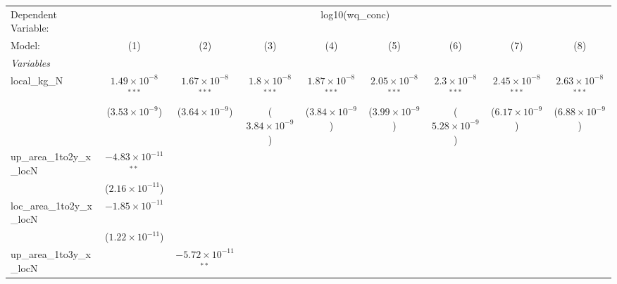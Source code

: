 
\begingroup
\centering
\begin{tabular}{lcccccccc}
   \tabularnewline \midrule \midrule
   Dependent Variable: & \multicolumn{8}{c}{log10(wq\_conc)}\\
   Model:                        & (1)                            & (2)                            & (3)                            & (4)                            & (5)                            & (6)                            & (7)                            & (8)\\  
   \midrule
   \emph{Variables}\\
   local\_kg\_N                  & $1.49\times 10^{-8}$$^{***}$   & $1.67\times 10^{-8}$$^{***}$   & $1.8\times 10^{-8}$$^{***}$    & $1.87\times 10^{-8}$$^{***}$   & $2.05\times 10^{-8}$$^{***}$   & $2.3\times 10^{-8}$$^{***}$    & $2.45\times 10^{-8}$$^{***}$   & $2.63\times 10^{-8}$$^{***}$\\    
                                 & ($3.53\times 10^{-9}$)         & ($3.64\times 10^{-9}$)         & ($3.84\times 10^{-9}$)         & ($3.84\times 10^{-9}$)         & ($3.99\times 10^{-9}$)         & ($5.28\times 10^{-9}$)         & ($6.17\times 10^{-9}$)         & ($6.88\times 10^{-9}$)\\    
   up\_area\_1to2y\_x\_locN      & $-4.83\times 10^{-11}$$^{**}$  &                                &                                &                                &                                &                                &                                &   \\   
                                 & ($2.16\times 10^{-11}$)        &                                &                                &                                &                                &                                &                                &   \\   
   loc\_area\_1to2y\_x\_locN     & $-1.85\times 10^{-11}$         &                                &                                &                                &                                &                                &                                &   \\   
                                 & ($1.22\times 10^{-11}$)        &                                &                                &                                &                                &                                &                                &   \\   
   up\_area\_1to3y\_x\_locN      &                                & $-5.72\times 10^{-11}$$^{**}$  &                                &                                &                                &                                &                                &   \\   

\end{tabular}
